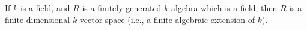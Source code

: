If $k$ is a field, and $R$ is a finitely generated $k$-algebra which is a field,
then $R$ is a finite-dimensional $k$-vector space (i.e., a finite algebraic
extension of $k$).
